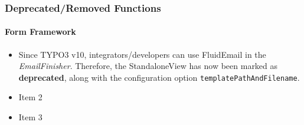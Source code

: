 %

\begin{frame}[fragile]
	\frametitle{Deprecated/Removed Functions}
	\framesubtitle{Form Framework}

	\begin{itemize}
		\item Since TYPO3 v10, integrators/developers can use FluidEmail in the \textit{EmailFinisher}.
			Therefore, the StandaloneView has now been marked as \textbf{deprecated},
			along with the configuration option \texttt{templatePathAndFilename}.
		\item Item 2
		\item Item 3
	\end{itemize}

\end{frame}

